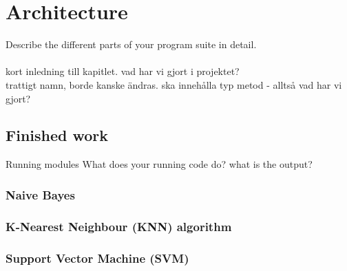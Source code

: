 \chapter{Architecture}
Describe the different parts of your program suite in detail.
\\\\
kort inledning till kapitlet. vad har vi gjort i projektet?\\
trattigt namn, borde kanske ändras. ska innehålla typ metod - alltså vad har vi gjort?

\section{Finished work}
Running modules
What does your running code do? what is the output?

\subsection{Naive Bayes}

\subsection{K-Nearest Neighbour (KNN) algorithm}

\subsection{Support Vector Machine (SVM)}

